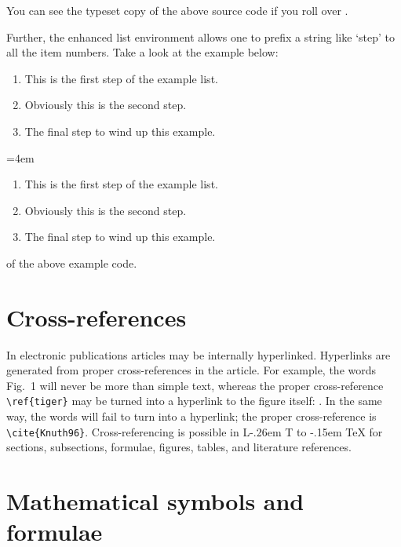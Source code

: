 \documentclass[a4paper,12pt]{article}
\makeatletter
\DeclareRobustCommand{\LaTeX}{L\kern-.26em%
        {\sbox\z@ T%
         \vbox to\ht\z@{\hbox{\check@mathfonts
           \fontsize\sf@size\z@
           \math@fontsfalse\selectfont
          A\,}%
         \vss}%
        }%
     \kern-.15em%
    \TeX}
\makeatother
\begin{document}
You can see the typeset copy of the above source code if you
roll over .

Further, the enhanced list environment allows one to prefix a
string like `step' to all the item numbers.  Take a look at the
example below:

\begin{vquote}
 \begin{enumerate}[Step 1.]
  \item This is the first step of the example list.
  \item Obviously this is the second step.
  \item The final step to wind up this example.
 \end{enumerate}
\end{vquote}

\begin{toolwrite}{10cm}
\lmrgn=4em
 \begin{enumerate}[Step 1.]
  \item This is the first step of the example list.
\item Obviously this is the second step.
\item The final step to wind up this example.
 \end{enumerate}
\end{toolwrite}

 of the above example code.

\section{Cross-references}
\hypertarget{crossreferences}{}

In electronic publications articles may be internally
hyperlinked. Hyperlinks are generated from proper
cross-references in the article.  For example, the words
\textcolor{black!80}{Fig.~1} will never be more than simple text,
whereas the proper cross-reference \verb+\ref{tiger}+ may be
turned into a hyperlink to the figure itself:
.  In the same way,
the words  will fail to turn into a
hyperlink; the proper cross-reference is \verb+\cite{Knuth96}+.
Cross-referencing is possible in \LaTeX{} for sections,
subsections, formulae, figures, tables, and literature
references.

\section{Mathematical symbols and formulae}
\hypertarget{math}{}
\end{document}
